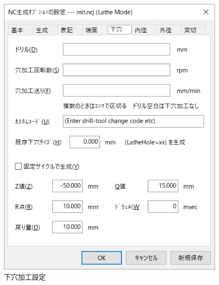 \begin{minipage}{0.5\textwidth}
\begin{figure}[H]
\centering
\includegraphics[scale=0.7]{No2/fig/ncj2.png}
\caption{下穴加工設定}
\label{fig:ncj2.png}
\end{figure}
\end{minipage}

